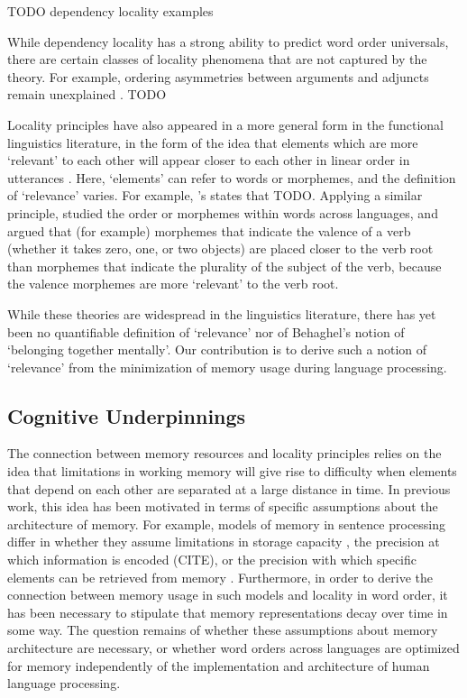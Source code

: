 TODO dependency locality examples

While dependency locality has a strong ability to predict word order universals, there are certain classes of locality phenomena that are not captured by the theory. For example, ordering asymmetries between arguments and adjuncts remain unexplained \citep{}. TODO

Locality principles have also appeared in a more general form in the functional linguistics literature, in the form of the idea that elements which are more `relevant' to each other will appear closer to each other in linear order in utterances \citep{givon1985,givon1991,bybee1985,newmeyer1992}. Here, `elements' can refer to words or morphemes, and the definition of `relevance' varies. For example, \citet{givon1985}'s  states that TODO. Applying a similar principle, \citet{bybee1985morphology} studied the order or morphemes within words across languages, and argued that (for example) morphemes that indicate the valence of a verb (whether it takes zero, one, or two objects) are placed closer to the verb root than morphemes that indicate the plurality of the subject of the verb, because the valence morphemes are more `relevant' to the verb root. %

While these theories are widespread in the linguistics literature, there has yet been no quantifiable definition of `relevance' nor of Behaghel's notion of `belonging together mentally'. Our contribution is to derive such a notion of `relevance' from the minimization of memory usage during language processing.

\subsection{Cognitive Underpinnings}

The connection between memory resources and locality principles relies on the idea that limitations in working memory will give rise to difficulty when elements that depend on each other are separated at a large distance in time. In previous work, this idea has been motivated in terms of specific assumptions about the architecture of memory. For example, models of memory in sentence processing differ in whether they assume limitations in storage capacity \citep{gibson1998linguistic}, the precision at which information is encoded (CITE), or the precision with which specific elements can be retrieved from memory \citep{lewis-activation-based-2005}. Furthermore, in order to derive the connection between memory usage in such models and locality in word order, it has been necessary to stipulate that memory representations decay over time in some way. The question remains of whether these assumptions about memory architecture are necessary, or whether word orders across languages are optimized for memory independently of the implementation and architecture of human language processing.


